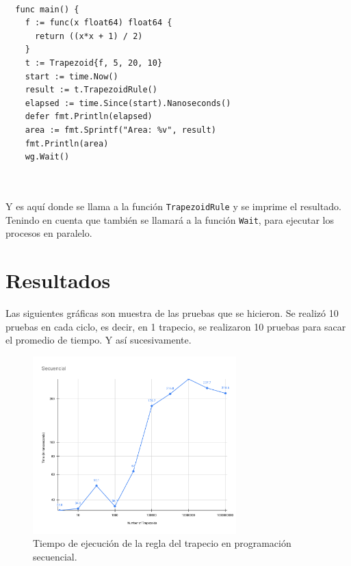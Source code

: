 \documentclass[a4paper]{article}
\begin{document}
\begin{lstlisting}[style=Golang, firstnumber=30]

  func main() {
    f := func(x float64) float64 {
      return ((x*x + 1) / 2)
    }
    t := Trapezoid{f, 5, 20, 10}
    start := time.Now()
    result := t.TrapezoidRule()
    elapsed := time.Since(start).Nanoseconds()
    defer fmt.Println(elapsed)
    area := fmt.Sprintf("Area: %v", result)
    fmt.Println(area)
    wg.Wait()
  
  
\end{lstlisting}
Y es aquí donde se llama a la función \texttt{TrapezoidRule} y se imprime el resultado.
Tenindo en cuenta que también se llamará a la función \texttt{Wait}, para ejecutar los procesos
en paralelo.

\section{Resultados}
Las siguientes gráficas son muestra de las pruebas que se hicieron.
Se realizó 10 pruebas en cada ciclo, es decir, en 1 trapecio, se realizaron
10 pruebas para sacar el promedio de tiempo. Y así sucesivamente. \\
\begin{figure}[H]
\centering
\includegraphics[width=0.7\textwidth]{Secuencial.pdf}
\caption{Tiempo de ejecución de la regla del trapecio en programación secuencial.}
\end{figure}
\end{document}
